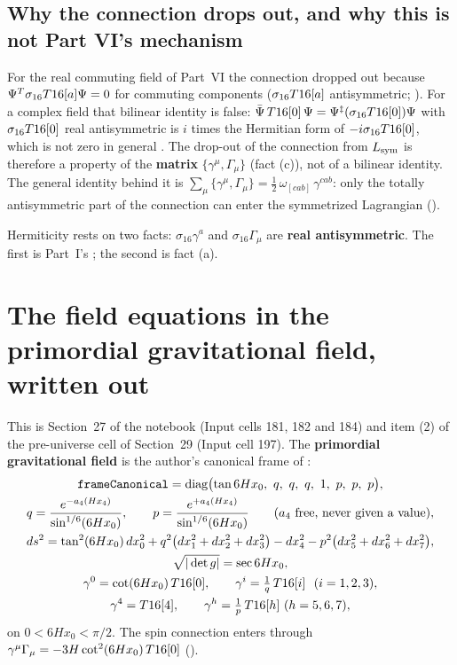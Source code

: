 \subsection{Why the connection drops out, and why this is not Part VI's mechanism}
\label{sec:4.3}

For the real commuting field of Part~VI the connection dropped out because
$\Psi^{T}\sigma_{16}T16[a]\Psi=0$ for commuting components ($\sigma_{16}T16[a]$ antisymmetric;
). For a complex field that bilinear identity is false:
$\bar\Psi\,T16[0]\,\Psi=\Psi^{\ddagger}(\sigma_{16}T16[0])\Psi$ with $\sigma_{16}T16[0]$ real
antisymmetric is $i$ times the Hermitian form of $-i\sigma_{16}T16[0]$, which is not zero in
general \cfderived. The drop-out of the connection from $L_{\mathrm{sym}}$ is therefore a property of the
\textbf{matrix} $\{\gamma^\mu,\Gamma_\mu\}$ (fact (c)), not of a bilinear identity. The general
identity behind it is $\sum_\mu\{\gamma^\mu,\Gamma_\mu\}=\tfrac12\,\omega_{[cab]}\,\gamma^{cab}$:
only the totally antisymmetric part of the connection can enter the symmetrized Lagrangian
().

Hermiticity rests on two facts: $\sigma_{16}\gamma^a$ and $\sigma_{16}\Gamma_\mu$ are \textbf{real
antisymmetric}. The first is Part~I's ; the second is
fact (a).

\section{The field equations in the primordial gravitational field, written out}
\label{sec:5}

This is Section~27 of the notebook (Input cells 181, 182 and 184) and item (2) of the pre-universe
cell of Section~29 (Input cell 197). The \textbf{primordial gravitational field} is the author's
canonical frame of :
\begin{gather*}
  \texttt{frameCanonical}=\diag\bigl(\tan 6Hx_0,\ q,\ q,\ q,\ 1,\ p,\ p,\ p\bigr),\\
  q=\frac{e^{-a_4(Hx_4)}}{\sin^{1/6}(6Hx_0)},\qquad p=\frac{e^{+a_4(Hx_4)}}{\sin^{1/6}(6Hx_0)}\qquad(a_4\text{ free, never given a value}),\\
  ds^2=\tan^2(6Hx_0)\,dx_0^2+q^2\bigl(dx_1^2+dx_2^2+dx_3^2\bigr)-dx_4^2-p^2\bigl(dx_5^2+dx_6^2+dx_7^2\bigr),\\
  \sqrt{|\det g|}=\sec 6Hx_0,\\
  \gamma^0=\cot(6Hx_0)\,\Tsix{0},\qquad \gamma^i=\tfrac1q\,\Tsix{i}\ \ (i=1,2,3),\\
  \gamma^4=\Tsix{4},\qquad \gamma^h=\tfrac1p\,\Tsix{h}\ (h=5,6,7),
\end{gather*}
on $0<6Hx_0<\pi/2$. The spin connection enters through
$\gamma^\mu\Gamma_\mu=-3H\cot^2(6Hx_0)\,T16[0]$ ().

